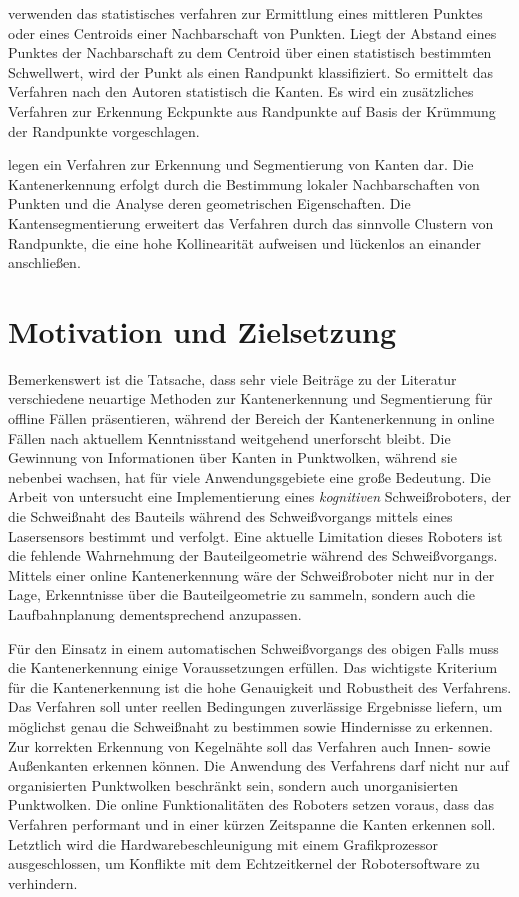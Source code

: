 \Textcite{ahmed_edge_2018} verwenden das statistisches verfahren zur Ermittlung eines mittleren Punktes oder eines Centroids einer Nachbarschaft von Punkten. Liegt der Abstand eines Punktes der Nachbarschaft zu dem Centroid über einen statistisch bestimmten Schwellwert, wird der Punkt als einen Randpunkt klassifiziert. So ermittelt das Verfahren nach den Autoren statistisch die Kanten. Es wird ein zusätzliches Verfahren zur Erkennung Eckpunkte aus Randpunkte auf Basis der Krümmung der Randpunkte vorgeschlagen.

\Textcite{ni_edge_2016} legen ein Verfahren zur Erkennung und Segmentierung von Kanten dar. Die Kantenerkennung erfolgt durch die Bestimmung lokaler Nachbarschaften von Punkten und die Analyse deren geometrischen Eigenschaften. Die Kantensegmentierung erweitert das Verfahren durch das sinnvolle Clustern von Randpunkte, die eine hohe Kollinearität aufweisen und lückenlos an einander anschließen. 

\section{Motivation und Zielsetzung} \label{Motivation}
Bemerkenswert ist die Tatsache, dass sehr viele Beiträge zu der Literatur verschiedene neuartige Methoden zur Kantenerkennung und Segmentierung für offline Fällen präsentieren, während der Bereich der Kantenerkennung in online Fällen nach aktuellem Kenntnisstand weitgehend unerforscht bleibt. Die Gewinnung von Informationen über Kanten in Punktwolken, während sie nebenbei wachsen, hat für viele Anwendungsgebiete eine große Bedeutung. Die Arbeit von \textcite{savla_intelligente_2022} untersucht eine Implementierung eines \textit{kognitiven} Schweißroboters, der die Schweißnaht des Bauteils während des Schweißvorgangs mittels eines Lasersensors bestimmt und verfolgt. Eine aktuelle Limitation dieses Roboters ist die fehlende Wahrnehmung der Bauteilgeometrie während des Schweißvorgangs. Mittels einer online Kantenerkennung wäre der Schweißroboter nicht nur in der Lage, Erkenntnisse über die Bauteilgeometrie zu sammeln, sondern auch die Laufbahnplanung dementsprechend anzupassen.

Für den Einsatz in einem automatischen Schweißvorgangs des obigen Falls muss die Kantenerkennung einige Voraussetzungen erfüllen. Das wichtigste Kriterium für die Kantenerkennung ist die hohe Genauigkeit und Robustheit des Verfahrens. Das Verfahren soll unter reellen Bedingungen zuverlässige Ergebnisse liefern, um möglichst genau die Schweißnaht zu bestimmen sowie Hindernisse zu erkennen. Zur korrekten Erkennung von Kegelnähte soll das Verfahren auch Innen- sowie Außenkanten erkennen können. Die Anwendung des Verfahrens darf nicht nur auf organisierten Punktwolken beschränkt sein, sondern auch unorganisierten Punktwolken. Die online Funktionalitäten des Roboters setzen voraus, dass das Verfahren performant und in einer kürzen Zeitspanne die Kanten erkennen soll. Letztlich wird die Hardwarebeschleunigung mit einem Grafikprozessor ausgeschlossen, um Konflikte mit dem Echtzeitkernel der Robotersoftware zu verhindern. 

